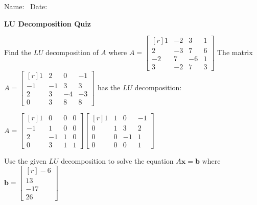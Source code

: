 \documentclass[11pt,answers]{exam} %
\renewcommand{\vec}[1]{\mathbf{#1}}
\newcommand{\mat}[1]{\begin{bmatrix*}[r] #1 \end{bmatrix*}}
\begin{document}
\flushleft
Name:\ \makebox[4in]{\hrulefill} \hspace{1in} Date:\ \makebox[1in]{\hrulefill}
\begin{center}
    \textbf{LU Decomposition Quiz}
\end{center}


\begin{questions}
    \question Find the $LU$ decomposition of $A$ where $A = \mat{1 & -2 & 3 & 1 \\ 2 & -3 & 7 & 6 \\ -2 & 7 & -6 & 1 \\ 3 & -2 & 7 & 3}$
    \newpage
    \question The matrix $A = \mat{1 & 2 & 0 & -1 \\ -1 & -1 & 3 & 3 \\ 2 & 3 & -4 & -3 \\ 0 & 3 & 8 & 8}$ has the $LU$ decomposition: \\
    \begin{center}
    $A = \mat{1 & 0 & 0 & 0 \\ -1 & 1 & 0 & 0 \\ 2 & -1 & 1 & 0 \\ 0 & 3 & 1 & 1} \mat{1 & 1 &  0 & -1 \\ 0 & 1 & 3 & 2 \\ 0 & 0 & -1 & 1 \\ 0 & 0 & 0 & 1}$
    \end{center}
    Use the given $LU$ decomposition to solve the equation $A\vec{x} = \vec{b}$ where $\vec{b} = \mat{-6 \\ 13 \\ -17 \\ 26}$
\end{questions}
\end{document}
